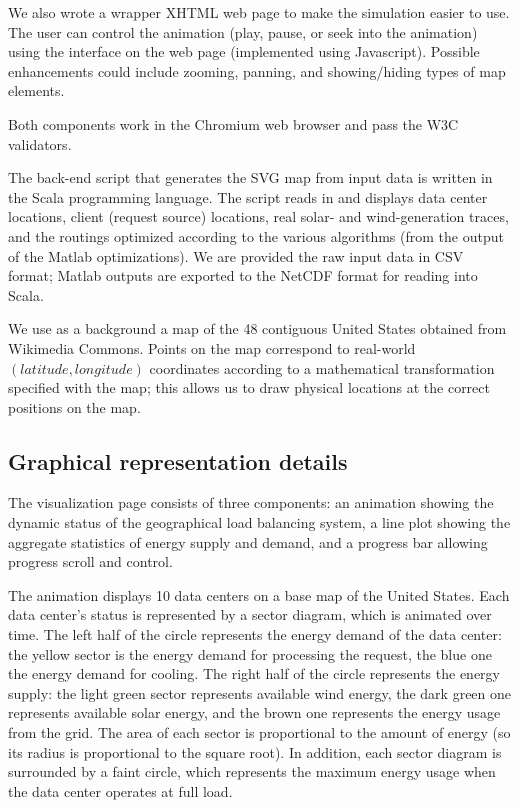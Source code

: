 \documentclass{acm_proc_article-sp}
\begin{document}
We also wrote a wrapper XHTML web page to make the simulation easier to use. The user can control the animation (play, pause, or seek into the animation) using the interface on the web page (implemented using Javascript). Possible enhancements could include zooming, panning, and showing/hiding types of map elements.

Both components work in the Chromium web browser and pass the W3C validators.

The back-end script that generates the SVG map from input data is written in the Scala programming language. The script reads in and displays data center locations, client (request source) locations, real solar- and wind-generation traces, and the routings optimized according to the various algorithms (from the output of the Matlab optimizations). We are provided the raw input data in CSV format; Matlab outputs are exported to the NetCDF format for reading into Scala.

We use as a background a map \cite{wikimap} of the 48 contiguous United States obtained from Wikimedia Commons. Points on the map correspond to real-world $(latitude, longitude)$ coordinates according to a mathematical transformation specified with the map; this allows us to draw physical locations at the correct positions on the map.

\subsection{Graphical representation details}
The visualization page consists of three components: an animation showing the dynamic status of the geographical load balancing system, a line plot showing the aggregate statistics of energy supply and demand, and a progress bar allowing progress scroll and control.

The animation displays 10 data centers on a base map of the United States. Each data center’s status is represented by a sector diagram, which is animated over time. The left half of the circle represents the energy demand of the data center: the yellow sector is the energy demand for processing the request, the blue one the energy demand for cooling. The right half of the circle represents the energy supply: the light green sector represents available wind energy, the dark green one represents available solar energy, and the brown one represents the energy usage from the grid. The area of each sector is proportional to the amount of energy (so its radius is proportional to the square root). In addition, each sector diagram is surrounded by a faint circle, which represents the maximum energy usage when the data center operates at full load.
\end{document}
